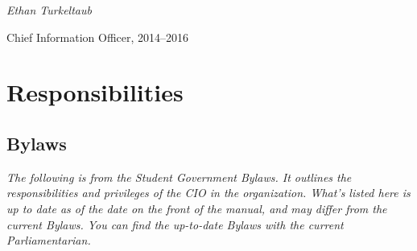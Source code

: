 \documentclass[11pt]{report}
\begin{document}
	\begin{flushright}
		\textit{Ethan Turkeltaub}
		
		Chief Information Officer, 2014--2016
	\end{flushright}

	

\chapter{Responsibilities}
	\section{Bylaws}
		\textit{The following is from the Student Government Bylaws. It outlines the responsibilities and privileges of the CIO in the organization. What's listed here is up to date as of the date on the front of the manual, and may differ from the current Bylaws. You can find the up-to-date Bylaws with the current Parliamentarian.}
	
\end{document}
